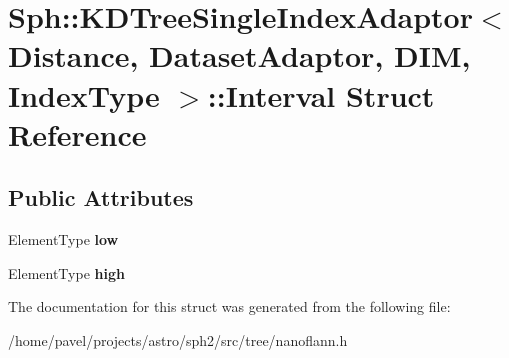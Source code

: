 \hypertarget{structSph_1_1KDTreeSingleIndexAdaptor_1_1Interval}{}\section{Sph\+:\+:K\+D\+Tree\+Single\+Index\+Adaptor$<$ Distance, Dataset\+Adaptor, D\+IM, Index\+Type $>$\+:\+:Interval Struct Reference}
\label{structSph_1_1KDTreeSingleIndexAdaptor_1_1Interval}
\subsection*{Public Attributes}
\begin{DoxyCompactItemize}
\item 
\hypertarget{structSph_1_1KDTreeSingleIndexAdaptor_1_1Interval_a3ead59019eab5a1268327047a6137ffc}{}\label{structSph_1_1KDTreeSingleIndexAdaptor_1_1Interval_a3ead59019eab5a1268327047a6137ffc} 
Element\+Type {\bfseries low}
\item 
\hypertarget{structSph_1_1KDTreeSingleIndexAdaptor_1_1Interval_aba3f07308ce8ad9b082c6d789f84f996}{}\label{structSph_1_1KDTreeSingleIndexAdaptor_1_1Interval_aba3f07308ce8ad9b082c6d789f84f996} 
Element\+Type {\bfseries high}
\end{DoxyCompactItemize}


The documentation for this struct was generated from the following file\+:\begin{DoxyCompactItemize}
\item 
/home/pavel/projects/astro/sph2/src/tree/nanoflann.\+h\end{DoxyCompactItemize}
